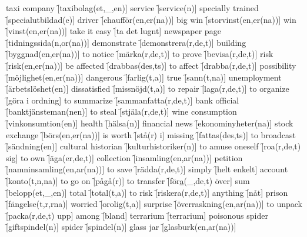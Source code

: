 \begin{questions}
\begin{multicols}{2}
        \question taxi company \f[taxibolag(et,\_,en)]
        \question service \f[service(n)]
        \question specially trained \f[specialutbildad(e)]
        \question driver \f[chaufför(en,er(na))]
        \question big win \f[storvinst(en,er(na))]
        \question win \f[vinst(en,er(na))]
        \question take it easy \f[ta det lugnt]
        \question newspaper page \f[tidningssida(n,or(na))]
        \question demonstrate \f[demonstrera(r,de,t)]
        \question building \f[byggnad(en,er(na))]
        \question to notice \f[märka(r,de,t)]
        \question to prove \f[bevisa(r,de,t)]
        \question risk \f[risk(en,er(na))]
        \question be affected \f[drabbas(des,ts)]
        \question to affect \f[drabba(r,de,t)]
        \question possibility \f[möjlighet(en,er(na))]
        \question dangerous \f[farlig(t,a)]
        \question true \f[sann(t,na)]
        \question unemployment \f[ärbetslöshet(en)]
        \question dissatisfied \f[missnöjd(t,a)]
        \question to repair \f[laga(r,de,t)]
        \question to organize \f[göra i ordning]
        \question to summarize \f[sammanfatta(r,de,t)]
        \question bank official \f[banktjänsteman(nen)]
        \question to steal \f[stjäla(r,de,t)]
        \question wine consumption \f[vinkonsumtion(en)]
        \question health \f[hälsa(n)]
        \question financial news \f[ekonominyheter(na)]
        \question stock exchange \f[börs(en,er(na))]
        \question is worth \f[stå(r) i]
        \question missing \f[fattas(des,ts)]
        \question to broadcast \f[sändning(en)]
        \question cultural historian \f[kulturhistoriker(n)]
        \question to amuse oneself \f[roa(r,de,t) sig]
        \question to own \f[äga(er,de,t)]
        \question collection \f[insamling(en,ar(na))]
        \question petition \f[namninsamling(en,ar(na))]
        \question to save \f[rädda(r,de,t)]
        \question simply \f[helt enkelt]
        \question account \f[konto(t,n,na)]
        \question to go on \f[pågå(r)]
        \question to transfer \f[för\underline{a}(\_,de,t) över]
        \question sum \f[belopp(et,\_,en)]
        \question total \f[total(t,a)]
        \question to risk \f[riskera(r,de,t)]
        \question anything \f[nåt]
        \question prison \f[fängelse(t,r,rna)]
        \question worried \f[orolig(t,a)]
        \question surprise \f[överraskning(en,ar(na))]
        \question to unpack \f[packa(r,de,t) upp]
        \question among \f[bland]
        \question terrarium \f[terrarium]
        \question poisonous spider \f[giftspindel(n)]
        \question spider \f[spindel(n)]
        \question glass jar \f[glasburk(en,ar(na))]

\end{multicols}
\end{questions}
